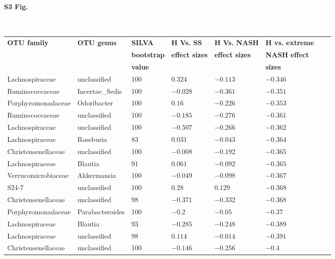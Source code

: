 \begin{table}[!ht]
\paragraph*{S3 Fig.}{\mbox{}}\\
\begin{tiny}
\begin{tabular}{|l|l|l|l|l|l|l|l|}
\hline
\bf{OTU family} & \bf{OTU genus} & \bf{SILVA} &\bf{H Vs. SS} & \bf{H Vs. NASH} & \bf{H vs. extreme} \\
& & \bf{bootstrap} & \bf{effect sizes} & \bf{effect sizes} & \bf{NASH effect} \\
& & \bf{value} & & & \bf{sizes}\\ \hline
Lachnospiraceae & unclassified & 100 & $0.324$ & $-0.113$ & $-0.346$ \\ \hline
Ruminococcaceae & Incertae_Sedis & 100 & $-0.028$ & $-0.361$ & $-0.351$ \\ \hline
Porphyromonadaceae & Odoribacter & 100 & $0.16$ & $-0.226$ & $-0.353$ \\ \hline
Ruminococcaceae & unclassified & 100 & $-0.185$ & $-0.276$ & $-0.361$ \\ \hline
Lachnospiraceae & unclassified & 100 & $-0.507$ & $-0.266$ & $-0.362$ \\ \hline
Lachnospiraceae & Roseburia & 83 & $0.031$ & $-0.043$ & $-0.364$ \\ \hline
Christensenellaceae & unclassified & 100 & $-0.008$ & $-0.192$ & $-0.365$ \\ \hline
Lachnospiraceae & Blautia & 91 & $0.061$ & $-0.092$ & $-0.365$ \\ \hline
Verrucomicrobiaceae & Akkermansia & 100 & $-0.049$ & $-0.098$ & $-0.367$ \\ \hline
S24-7 & unclassified & 100 & $0.28$ & $0.129$ & $-0.368$ \\ \hline
Christensenellaceae & unclassified & 98 & $-0.371$ & $-0.332$ & $-0.368$ \\ \hline
Porphyromonadaceae & Parabacteroides & 100 & $-0.2$ & $-0.05$ & $-0.37$ \\ \hline
Lachnospiraceae & Blautia & 93 & $-0.285$ & $-0.248$ & $-0.389$ \\ \hline
Lachnospiraceae & unclassified & 98 & $0.114$ & $-0.014$ & $-0.391$ \\ \hline
Christensenellaceae & unclassified & 100 & $-0.146$ & $-0.256$ & $-0.4$ \\ \hline

\end{tabular}
\end{tiny}
\end{table}
